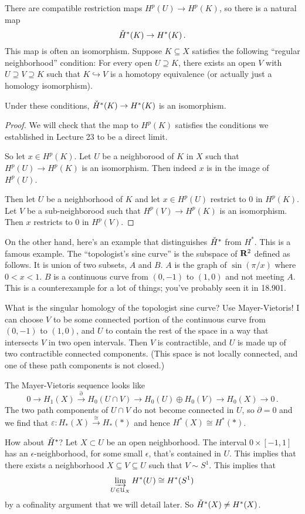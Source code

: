 There are compatible restriction maps $H^p(U)\to H^p(K)$, so there is a natural
map
\[
\check{H}^\ast(K)\to H^\ast(K)\,.
\]
This map is often an isomorphism. Suppose $K\subseteq X$ satisfies the following ``regular neighborhood'' condition: For every open $U\supseteq K$, there exists an open $V$ with $U\supseteq V\supseteq K$ such that $K\hookrightarrow V$ is a homotopy equivalence (or actually just a homology isomorphism).
\begin{lemma} Under these conditions, $\check{H}^\ast(K)\to H^\ast(K)$ is an isomorphism.
\end{lemma}
\begin{proof}
We will check that the map to $H^p(K)$ satisfies the conditions we established in Lecture 23 to be a direct limit. 

So let $x\in H^p(K)$. Let $U$ be a neighborood of $K$ in $X$ such that 
$H^p(U)\to H^p(K)$ is an isomorphism. Then indeed $x$ is in the image of
$H^p(U)$. 

Then let $U$ be a neighborhood of $K$ and let $x\in H^p(U)$ restrict to
0 in $H^p(K)$. Let $V$ be a sub-neighborood such that $H^p(V)\to H^p(K)$
is an isomorphism. Then $x$ restricts to 0 in $H^p(V)$.
\end{proof}

On the other hand, here's an example that distinguishes $\check{H}^\ast$ from $H^\ast$. This is a famous example. The ``topologist's sine curve'' is the subspace of $\mathbf R^2$ defined as follows. It is union of two
subsets, $A$ and $B$. $A$ is the graph of $\sin(\pi/x)$ where $0<x<1$. 
$B$ is a continuous curve from $(0,-1)$ to $(1,0)$ and not meeting $A$. This is a counterexample for a lot of things; you've probably seen it in 18.901.


What is the singular homology of the topologist sine curve? Use Mayer-Vietoris! I can choose $V$ to be some connected portion of the continuous curve from $(0,-1)$ to $(1,0)$, and $U$ to contain the rest of the space in a way that intersects $V$ in two open intervals. Then $V$ is contractible, and $U$ is made up of two contractible connected components. (This space is not locally connected, and one of these path components is not closed.)

The Mayer-Vietoris sequence looks like
\[
0\to H_1(X)\xrightarrow{\partial} H_0(U\cap V)\to H_0(U)\oplus H_0(V)\to H_0(X)\to 0\,.
\]
The two path components of $U\cap V$ do not become connected in $U$, so $\partial=0$ and we find that $\varepsilon:H_*(X)\xrightarrow{\cong}H_*(\ast)$
and hence $H^*(X)\cong H^*(*)$. 

How about $\check{H}^\ast$? Let $X\subset U$ be an open neighborhood. The interval
$0\times[-1,1]$
has an $\epsilon$-neighborhood, for some small $\epsilon$, that's contained in $U$. This implies that there exists a neighborhood $X\subseteq V\subseteq U$ such that $V\sim S^1$. This implies that 
\[
\varinjlim_{U\in\mathcal{U}_X}H^\ast(U)\cong H^\ast(S^1)
\]
by a cofinality argument that we will detail later. So $\check{H}^\ast(X)\neq H^\ast(X)$.

